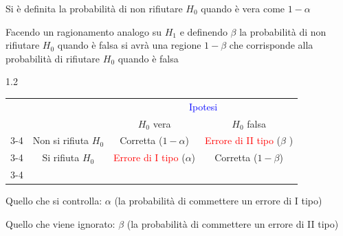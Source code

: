 \documentclass[compress, xcolor=table]{beamer}
\newcommand\Factor{1.2}
\begin{document}
		\begin{frame}
			Si è definita la probabilità di non rifiutare $H_0$ quando è vera come $1-\alpha$
			
			
			Facendo un ragionamento analogo su $H_1$ e definendo $\beta$ la probabilità di non rifiutare $H_0$ quando è falsa si avrà una regione $1- \beta$ che corrisponde alla probabilità di rifiutare $H_0$ quando è falsa
			
			\begin{spacing}\Factor
				\begin{tabular}{c  c  |c| c|}
					& \multicolumn{1}{c}{} & \multicolumn{2}{c}{\textcolor{blue}{Ipotesi}} \\
					& \multicolumn{1}{c}{} & \multicolumn{1}{c}{$H_0$ vera} & \multicolumn{1}{c}{$H_0$ falsa} \\
					\cline{3-4}
					\multirow{2}{*}{\textcolor{blue}{Decisione}}& Non si rifiuta $H_0$ & \textcolor{green!10!black!80}{Corretta} ($1-\alpha$)&  \textcolor{red}{Errore di II tipo} ($\beta$ )\\
					\cline{3-4}
					& Si rifiuta $H_0$  &\textcolor{red}{Errore di I tipo} ($\alpha$) &  \textcolor{green!10!black!80}{Corretta} ($1-\beta$)\\
					\cline{3-4} 
				\end{tabular}
			\end{spacing}
	\vspace{3mm}
	
	Quello che si controlla: $\alpha$ (la probabilità di commettere un errore di I tipo)
	
	Quello che viene ignorato: $\beta$ (la probabilità di commettere un errore di II tipo)	
			
		\end{frame}
		
\end{document}
